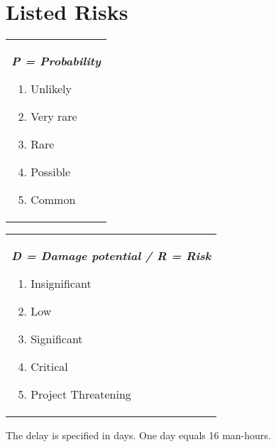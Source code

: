 \section{Listed Risks}
\begin{tabular}[t]{@{}>{\raggedright\arraybackslash}p{}}
  \textbf{\textit{P = Probability}}
  \begin{enumerate}[topsep=0pt,itemsep=-2pt,leftmargin=13pt]
  \item Unlikely
  \item Very rare
  \item Rare
  \item Possible
  \item Common
  \end{enumerate}
\end{tabular}
\begin{tabular}[t]{@{}>{\raggedright\arraybackslash}p{}@{}}
  \textbf{\textit{D = Damage potential  / R = Risk}}
  \begin{enumerate}[topsep=0pt,itemsep=-2pt,leftmargin=13pt]
  \item Insignificant
  \item Low
  \item Significant
  \item Critical
  \item Project Threatening 
  \end{enumerate}
\end{tabular}
The delay is specified in days. One day equals 16 man-hours.
